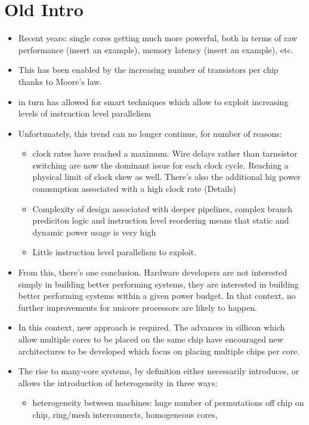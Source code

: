 \section{Old Intro}
\begin{itemize}
\item Recent years: single cores getting much more powerful,
both in terms of raw performance (insert an example), 
memory latency (insert an example), etc.
\item This has been enabled by the increasing
number of transistors per chip thanks to Moore's law. 
\item in turn has allowed for 
smart techniques which allow to exploit increasing
levels of instruction level parallelism 
\item Unfortunately, this trend can no longer
continue, for number of reasons:
\begin{itemize}
\item clock rates have reached a maximum. Wire delays
rather than tarnsistor switching are now the dominant
issue for each clock cycle. Reaching a physical limit of clock
skew as well.  
There's also the additional hig power conusmption associated
with a high clock rate (Details) 
\item Complexity of design associated with deeper pipelines,
complex branch prediciton logic and instruction level reordering
means that static and dynamic power usage is very high
\item Little instruction level parallelism to exploit.  
\end{itemize}
\item From this, there's one conclusion. Hardware developers are not 
interested simply in building better performing systems, they 
are interested in building better performing systems within a given
power budget. In that context, no further improvements for unicore
processors are likely to happen. 
\item In this context, new approach is required. The advances
in sillicon which allow multiple cores to be placed on the same
chip have encouraged new architectures to be developed
which focus on placing multiple chips per core. 
\item The rise to many-core systems, by definition either necessarily 
introduces, or allows the introduction of heterogeneity in three ways: 
\begin{itemize}
\item heterogeneity between machines: huge number of permutations
off chip on chip, ring/mesh interconnects, homogeneous cores, 

\end{itemize}
\end{itemize}
